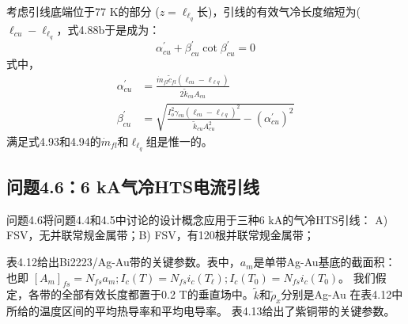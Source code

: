 考虑引线底端位于77 K的部分 ($z=\ell_{\ell_q}$长)，引线的有效气冷长度缩短为($\ell_{cu}-\ell_{\ell_q}$，式4.88b于是成为：
\begin{equation}%
\alpha_{cu}^{\prime}+\beta_{cu}^{\prime}\cot\beta_{cu}^{\prime}=0
\end{equation}
式中，
\begin{subequations}
	\begin{align*}
\alpha_{cu}^{\prime}&=\frac{\dot{m}_{fl}\tilde{c}_{fl}(\ell_{cu}-\ell_{\ell q})}{2\tilde{k}_{cu}A_{cu}}\\
\beta_{cu}^{\prime}&=\sqrt{\frac{I_{o}^{2}\gamma_{cu}(\ell_{cu}-\ell_{\ell q})^2}{\tilde{k}_{cu}A_{cu}^{2}}-(\alpha_{cu}^{\prime})^2}
	\end{align*}
\end{subequations}
满足式4.93和4.94的$\dot{m}_{fl}$和$\ell_{\ell_q}$组是惟一的。

\subsection{问题4.6：6 kA气冷HTS电流引线}
问题4.6将问题4.4和4.5中讨论的设计概念应用于三种6 kA的气冷HTS引线：
A) FSV，无并联常规金属带；B) FSV，有120根并联常规金属带；
 
表4.12给出Bi2223/Ag-Au带的关键参数。表中，$a_m$是单带Ag-Au基底的截面积：
也即 $[A_m]_{fs}=N_{fs} a_m; I_c(T)=N_{fs} i_c(T_\ell);I_c(T_0)=N_{fs}i_c(T_0)$。
我们假定，各带的全部有效长度都置于0.2 T的垂直场中。$\tilde{k}$和$\tilde{\rho}_x$分别是Ag-Au
在表4.12中所给的温度区间的平均热导率和平均电导率。
表4.13给出了紫铜带的关键参数。

